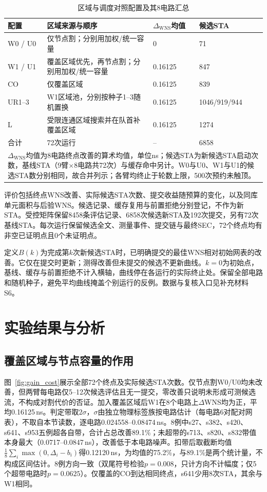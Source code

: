 \documentclass[twocolumn,10pt,fontset=windows]{ctexart}
\begin{document}
\begin{table}[htbp]
\centering\caption{区域与调度对照配置及其8电路汇总}\label{tab:arms}
\footnotesize\setlength{\tabcolsep}{3pt}
\begin{tabular}{p{1.1cm}p{2.75cm}p{1.4cm}p{1.62cm}}
\toprule 配置 & 区域来源与顺序 & $\Delta_{\mathrm{WNS}}$均值 & 候选STA\\\midrule
W0 / U0 & 仅节点割；分别用加权/统一容量 & 0 & 71\\
W1 / U1 & 覆盖区域优先，再节点割；分别用加权/统一容量 & 0.16125 & 847\\
CO & 仅覆盖区域 & 0.16125 & 839\\
UR1--3 & W1区域池，分别按种子1--3随机置换 & 0.16125 & 1046/919/944\\
L & 受限连通区域搜索并在队首补覆盖区域 & 0.16125 & 1274\\
\midrule
合计 & 72次运行 & -- & 6858\\
\bottomrule
\multicolumn{4}{p{0.92\columnwidth}}{\footnotesize $\Delta_{\mathrm{WNS}}$均值为8电路终点改善的算术均值，单位ns；候选STA为新候选STA启动次数，基线STA（9臂$\times$8电路共72次）与缓存命中另计。W0与U0、W1与U1的候选STA数分别相同，故合并列示；各臂均终止于轮数上限，500次预约未触顶。}\\
\end{tabular}
\end{table}

评价包括终点WNS改善、实际候选STA次数、提交收益随预算的变化，以及同库单元面积与后验WNS。候选记录、缓存复用与前置拒绝分别登记，不作为新STA。受控矩阵保留8458条评估记录、6858次候选新STA及192次提交，另有72次基线STA。每次运行保留候选全文、测量事件、提交链与最终SEC，72个终点均有非空已证明点且0个未证明点。

定义$B(k)$为完成第$k$次新候选STA时，已明确提交的最佳WNS相对初始网表的改善。它仅在提交时更新；测得改善但未提交的候选不更新曲线。$k=0$为初始点，基线、缓存与前置拒绝不计入横轴，曲线停在各运行的实际终止处。保留全部电路和随机种子，避免平均曲线掩盖个别运行的反例。数据与复核入口见补充材料S6。

\section{实验结果与分析}

\subsection{覆盖区域与节点容量的作用}\label{sec:gain}

图~\ref{fig:gain_cost}展示全部72个终点及实际候选STA次数。仅节点割W0/U0均未改善，但两臂每电路仅5--12次候选评估且无一提交，零改善只说明未形成可测候选流，不构成对割代价的否证。加入覆盖区域后W1在8个电路上$\Delta$WNS均为正，平均0.16125\,ns。判定带取$2\sigma$，$\sigma$由独立物理标签族按电路估计（每电路6对配对网表），不取自本节读数，逐电路0.024558--0.08474\,ns。8例中s27、s382、s420、s641、s953五例超各自带，合计占总改善89.1\%；未超带的s713、s820、s832带值本身最大（0.0717--0.0847\,ns），改善低于本电路噪声。扣带后取截断均值$\frac{1}{8}\sum_i\max(0,\Delta_i-b_i)$得0.12120\,ns，为均值的75.2\%，与89.1\%是两个统计量，不构成区间估计。8例方向一致（双尾符号检验$p=0.008$，只计方向不计幅度；仅5个超带电路时$p=0.0625$）。仅覆盖的CO到达相同终点，s641少用8次STA，其余与W1相同。
\end{document}
